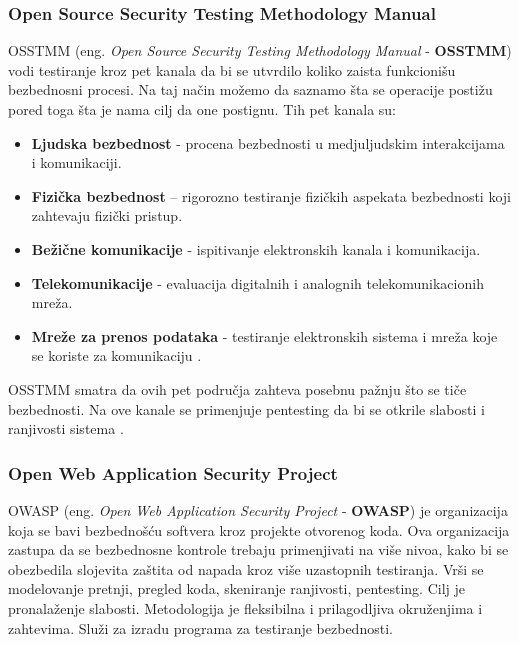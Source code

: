 \documentclass[a4paper,12pt]{article}
\begin{document}
\subsubsection{Open Source Security Testing Methodology Manual}

OSSTMM (eng. \textit{Open Source Security Testing Methodology Manual} - \textbf{OSSTMM}) vodi testiranje kroz pet kanala da bi se utvrdilo koliko zaista funkcionišu bezbednosni procesi. Na taj način možemo da saznamo šta se operacije postižu pored toga šta je nama cilj da one postignu. Tih pet kanala su:

\begin{itemize}
    \item \textbf{Ljudska bezbednost} - procena bezbednosti u medjuljudskim interakcijama i komunikaciji.

    \item \textbf{Fizička bezbednost} – rigorozno testiranje fizičkih aspekata bezbednosti koji zahtevaju fizički pristup.

    \item \textbf{Bežične komunikacije} - ispitivanje elektronskih kanala i komunikacija.  

    \item \textbf{Telekomunikacije} - evaluacija digitalnih i analognih telekomunikacionih mreža.

    \item \textbf{Mreže za prenos podataka} - testiranje elektronskih sistema i mreža koje se koriste za komunikaciju \cite{osstmm}.
\end{itemize}

OSSTMM smatra da ovih pet područja zahteva posebnu pažnju što se tiče bezbednosti. Na ove kanale se primenjuje pentesting da bi se otkrile slabosti i ranjivosti sistema \cite{osstmm}.


\subsubsection{Open Web Application Security Project}

OWASP (eng. \textit{Open Web Application Security Project} - \textbf{OWASP}) je organizacija koja se bavi bezbednošću softvera kroz projekte otvorenog koda. Ova organizacija zastupa da se bezbednosne kontrole trebaju primenjivati na više nivoa, kako bi se obezbedila slojevita zaštita od napada kroz više uzastopnih testiranja. Vrši se modelovanje pretnji, pregled koda, skeniranje ranjivosti, pentesting. Cilj je pronalaženje slabosti. Metodologija je fleksibilna i prilagodljiva okruženjima i zahtevima. Služi za izradu programa za testiranje bezbednosti.
\end{document}
